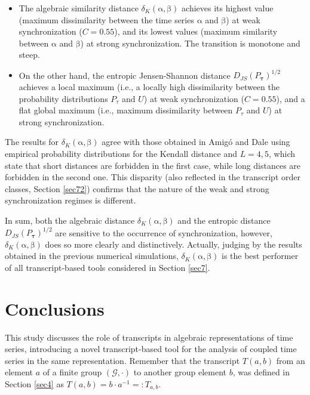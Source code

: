 \documentclass[%
 aip,
 amsmath,amssymb,
 reprint,%
]{revtex4-1}
\begin{document}
\begin{itemize}
\item The algebraic similarity distance $\delta _{K}(\mathrm{\alpha },\mathrm{\beta })$
achieves its highest value (maximum dissimilarity between the time series $%
\mathrm{\alpha }$ and $\mathrm{\beta }$) at weak synchronization ($C=0.55$),
and its lowest values (maximum similarity between $\mathrm{\alpha }$ and $%
\mathrm{\beta }$) at strong synchronization. The transition is monotone and
steep.

\item On the other hand, the entropic Jensen-Shannon distance $D_{JS}(P_{\mathbf{\tau 
}})^{1/2}$ achieves a local maximum (i.e., a locally high dissimilarity
between the probability distributions $P_{\tau }$ and $U$) at weak
synchronization ($C=0.55$), and a flat global maximum (i.e., maximum
dissimilarity between $P_{\tau }$ and $U$) at strong synchronization.
\end{itemize}

The results for $\delta _{K}(\mathrm{\alpha },\mathrm{\beta })$ agree with
those obtained in Amig\'{o} and Dale \cite{Amigo2025} using empirical probability distributions for the Kendall distance and $L=4,5$, which
state that short distances are forbidden in the first case, while long
distances are forbidden in the second one. This disparity (also reflected in
the transcript order classes, Section \ref{sec72}) confirms that the nature
of the weak and strong synchronization regimes is different.

In sum, both the algebraic distance $\delta _{K}(\mathrm{\alpha },\mathrm{\beta })$ and the entropic distance $D_{JS}(P_{\mathbf{\tau }})^{1/2}$ are sensitive to the occurrence of synchronization, however, $\delta _{K}(\mathrm{\alpha },\mathrm{\beta })$ does so more clearly and distinctively. Actually, judging by the results obtained in the previous numerical simulations, $\delta _{K}(\mathrm{\alpha },\mathrm{\beta })$ is the best performer of all transcript-based tools considered in Section \ref{sec7}.  


\section{Conclusions}

\label{sec8}

This study discusses the role of transcripts in algebraic representations of time series, introducing a novel transcript-based tool for the analysis of coupled time series in the same representation. Remember that the transcript $T(a,b)$ from an element $a$ of a finite group $(\mathcal{G},\cdot )$ to another group element $b$, was defined in Section \ref{sec4} as $T(a,b)=b\cdot a^{-1}=:T_{a,b}$.
\end{document}
